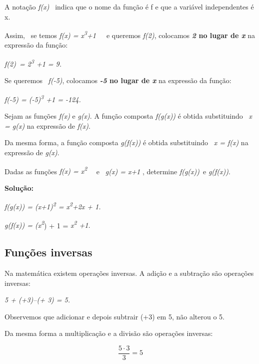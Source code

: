 A notação \textit{f(x)}~ indica que o nome da função é f e que a variável independentes é x. 

Assim,~ se temos \textit{f(x) = x\textsuperscript{3}+1}~~~e queremos  \textit{f(2)}, colocamos \textbf{\textit{2} no lugar de \textit{x}} na expressão da função:

\textit{f(2)~=  2\textsuperscript{3} +1 = 9.}

Se queremos~ \textit{f(-5)}, colocamos \textbf{\textit{-5} no lugar de \textit{x}} na expressão da função:

\textit{f(-5) = (-5)\textsuperscript{3} +1 = -124.}

\begin{caixa}
    \begin{tdefinicao}
        Sejam as funções \textit{f(x)} e \textit{g(x)}. 
        A função composta \textit{f(g(x))} é obtida substituindo~ \textit{x = g(x)} na expressão de \textit{f(x)}.

        Da mesma forma, a função composta \textit{g(f(x))} é obtida substituindo~ \textit{x = f(x)} na expressão de \textit{g(x)}. \qedsymbol{}
    \end{tdefinicao}
\end{caixa}

\begin{texemplo}
    Dadas as funções   \textit{f(x) = x\textsuperscript{2}}~~ e~ \textit{g(x) = x+1} , determine \textit{f(g(x))}~e  \textit{g(f(x))}.

    \textbf{Solução: }

    \textit{f(g(x)) = (x+1)\textsuperscript{2} = x\textsuperscript{2}+2x + 1.}

    \textit{g(f(x)) = (x\textsuperscript{2}}) + 1 = \textit{x\textsuperscript{2} +1.}
\end{texemplo}

\subsection{Funções inversas}

Na matemática existem operações inversas. A adição e a subtração são operações inversas:

\textit{5 + (+3)–(+ 3) = 5.}

Observemos que adicionar e depois subtrair (+3) em 5, não alterou o 5. 

Da mesma forma a multiplicação e a divisão são operações inversas:

 \[ \frac{5 \cdot 3}{3}=5 \] 

